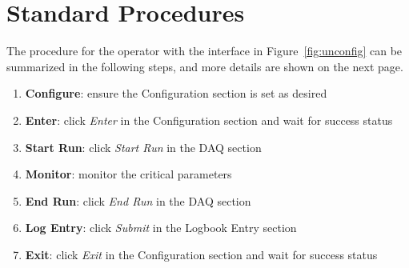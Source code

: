 \documentclass[amsmath,amssymb,notitlepage,12pt]{revtex4}
\begin{document}
\section{Standard Procedures}\label{sec:user}
The procedure for the operator with the interface in Figure~\ref{fig:unconfig} can be summarized in the following steps, and more details are shown on the next page.
\begin{enumerate}
\vspace{-4mm}\item {\bf Configure}:  ensure the Configuration section is set as desired
\vspace{-4mm}\item {\bf Enter}: click {\em Enter} in the Configuration section and wait for success status
\vspace{-4mm}\item {\bf Start Run}: click {\em Start Run} in the DAQ section
\vspace{-4mm}\item {\bf Monitor}: monitor the critical parameters
\vspace{-4mm}\item {\bf End Run}: click {\em End Run} in the DAQ section
\vspace{-4mm}\item {\bf Log Entry}: click {\em Submit} in the Logbook Entry section 
\vspace{-4mm}\item {\bf Exit}: click {\em Exit} in the Configuration section and wait for success status
\end{enumerate}
\end{document}
